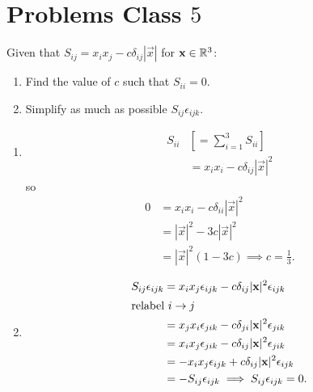 \documentclass[10pt, a4paper]{article}
\begin{document}
\newpage

\section{Problems Class \texorpdfstring{$5$}{}}

\begin{problem}[$2010$ Question $2$]
    Given that $S_{ij} = x_ix_j - c\delta_{ij}|\vec{x}|$ for $\vec{x} \in \R ^ 3$:

    \begin{enumerate}[label = (\alph*)]
        \item Find the value of $c$ such that $S_{ii} = 0$.

        \item Simplify as much as possible $S_{ij}\epsilon_{ijk}$.
    \end{enumerate}

    \begin{solution}
        \begin{enumerate}[label = (\alph*)]
            \item
            \begin{align*}
                S_{ii} &\left[= \sum_{i = 1}^{3}S_{ii}\right] \\
                &= x_ix_i - c\delta_{ij}|\vec{x}| ^ 2
            \end{align*}
            so
            \begin{align*}
                0 &= x_ix_i - c\delta_{ii}|\vec{x}| ^ 2 \\
                &= |\vec{x}| ^ 2 - 3c|\vec{x}| ^ 2 \\
                &= |\vec{x}| ^ 2(1 - 3c) \implies c = \frac{1}{3}.
            \end{align*}

            \item
            \begin{align*}
                S_{ij}\epsilon_{ijk} &= x_ix_j\epsilon_{ijk} - c\delta_{ij}|\vec{x}| ^ 2\epsilon_{ijk} \\
                \intertext{relabel $i \to j$}
                &= x_jx_i\epsilon_{jik} - c\delta_{ji}|\vec{x}| ^ 2\epsilon_{jik} \\
                &= x_ix_j\epsilon_{jik} - c\delta_{ij}|\vec{x}| ^ 2\epsilon_{jik} \\
                &= -x_ix_j\epsilon_{ijk} + c\delta_{ij}|\vec{x}| ^ 2\epsilon_{ijk} \\
                &= -S_{ij}\epsilon_{ijk} \implies S_{ij}\epsilon_{ijk} = 0.
            \end{align*}
        \end{enumerate}
    \end{solution}
\end{problem}
\end{document}
